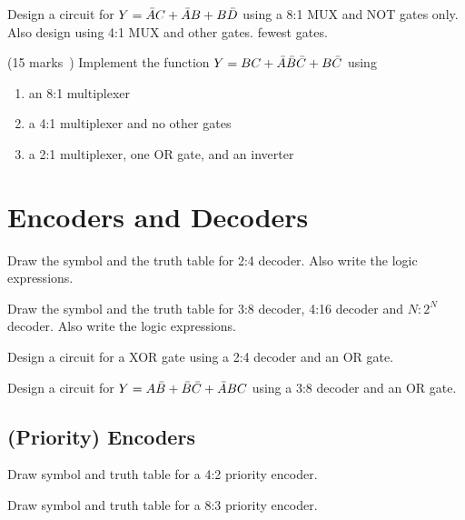 \begin{example}
  Design a circuit for $Y = \bar{A} C + \bar{A} B + B \bar{D} $ using a 8:1 MUX and NOT
  gates only. Also design using 4:1 MUX and other gates.
   fewest gates.
\end{example}
\vspace{10em}

\begin{prob}(15 marks~\cite[Ex-2.42]{harris2022digital})
  Implement the function $Y = BC + \bar{A} \bar{B} \bar{C} + B\bar{C}$ using
  \begin{enumerate}
    \item an 8:1 multiplexer
    \item a 4:1 multiplexer and no other gates
    \item a 2:1 multiplexer, one OR gate, and an inverter
  \end{enumerate}
\end{prob}

\section{Encoders and Decoders}

\begin{example}
Draw the symbol and the truth table for 2:4 decoder. Also write the logic expressions.
\end{example}
\vspace{10em}

\begin{example}
  Draw the symbol and the truth table for 3:8 decoder, 4:16 decoder and $N:2^N$ decoder. Also write the logic expressions.
\end{example}
\vspace{10em}

\begin{example}
Design a circuit for a XOR gate using a 2:4 decoder and an OR gate.
\end{example}
\vspace{10em}

\begin{example}
  Design a circuit for $Y = A\bar{B} + \bar{B} \bar{C} + \bar{A} B C$ using a 3:8 decoder and an
  OR gate.
\end{example}
\vspace{10em}


\subsection{(Priority) Encoders}

\begin{example}
  Draw symbol and truth table for a 4:2 priority encoder. 
\end{example}
\vspace{10em}

\begin{example}
  Draw symbol and truth table for a 8:3 priority encoder. 
\end{example}
\vspace{10em}
